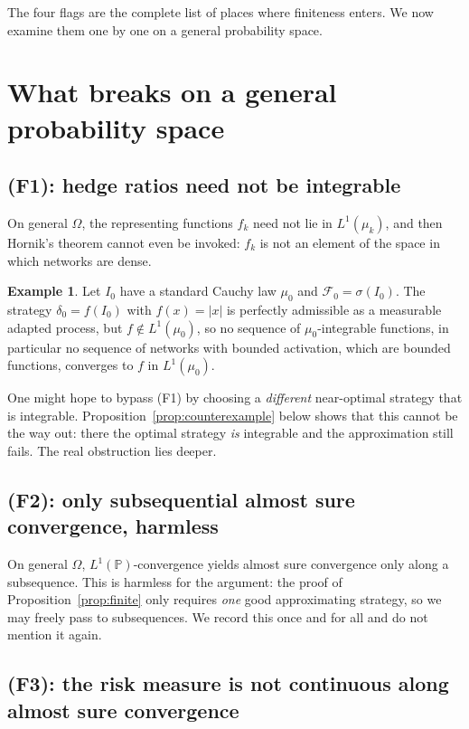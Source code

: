 \documentclass[11pt,a4paper]{report}
\numberwithin{equation}{chapter}
\theoremstyle{plain}
\theoremstyle{definition}
\newtheorem{example}[proposition]{Example}
\newcommand{\PP}{\mathbb{P}}
\newcommand{\F}{\mathcal{F}}
\begin{document}
The four flags are the complete list of places where finiteness enters. We now examine them one by one on a general probability space.

\section{What breaks on a general probability space}\label{sec:breaks}

\subsection*{(F1): hedge ratios need not be integrable}

On general $\Omega$, the representing functions $f_k$ need not lie in $L^1(\mu_k)$, and then Hornik's theorem cannot even be invoked: $f_k$ is not an element of the space in which networks are dense.

\begin{example}\label{ex:integrability}
    Let $I_0$ have a standard Cauchy law $\mu_0$ and $\F_0=\sigma(I_0)$. The strategy $\delta_0=f(I_0)$ with $f(x)=|x|$ is perfectly admissible as a measurable adapted process, but $f\notin L^1(\mu_0)$, so no sequence of $\mu_0$-integrable functions, in particular no sequence of networks with bounded activation, which are bounded functions, converges to $f$ in $L^1(\mu_0)$.
\end{example}

One might hope to bypass (F1) by choosing a \emph{different} near-optimal strategy that is integrable. Proposition~\ref{prop:counterexample} below shows that this cannot be the way out: there the optimal strategy \emph{is} integrable and the approximation still fails. The real obstruction lies deeper.

\subsection*{(F2): only subsequential almost sure convergence, harmless}

On general $\Omega$, $L^1(\PP)$-convergence yields almost sure convergence only along a subsequence. This is harmless for the argument: the proof of Proposition~\ref{prop:finite} only requires \emph{one} good approximating strategy, so we may freely pass to subsequences. We record this once and for all and do not mention it again.

\subsection*{(F3): the risk measure is not continuous along almost sure convergence}
\end{document}

